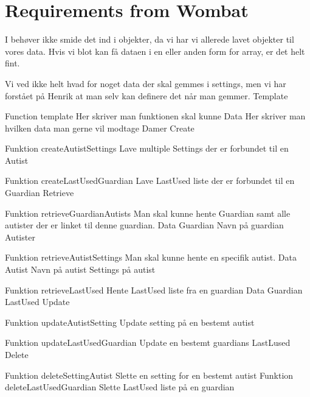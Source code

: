 \chapter{Requirements from Wombat}
\label{sec:timerreq}
I beh\o{}ver ikke smide det ind i objekter, da vi har vi allerede lavet objekter til vores data. 
Hvis vi blot kan f\aa{} dataen i en eller anden form for array, er det helt fint.

Vi ved ikke helt hvad for noget data der skal gemmes i settings, men vi har forst\aa{}et p\aa{} Henrik at man selv kan definere det n\aa{}r man gemmer.
Template

Function template
Her skriver man funktionen skal kunne
Data
Her skriver man hvilken data man gerne vil modtage
Damer
Create

Funktion createAutistSettings
Lave multiple Settings der er forbundet til en Autist

Funktion createLastUsedGuardian
Lave LastUsed liste der er forbundet til en Guardian
Retrieve

Funktion retrieveGuardianAutists
Man skal kunne hente Guardian samt alle autister der er linket til denne guardian.
Data
Guardian
Navn p\aa{} guardian
Autister

Funktion retrieveAutistSettings
Man skal kunne hente en specifik autist.
Data
Autist
Navn p\aa{} autist
Settings p\aa{} autist

Funktion retrieveLastUsed
Hente LastUsed liste fra en guardian
Data
Guardian
LastUsed
Update

Funktion updateAutistSetting
Update setting p\aa{} en bestemt autist

Funktion updateLastUsedGuardian
Update en bestemt guardians LastLused 
Delete

Funktion deleteSettingAutist
Slette en setting for en bestemt autist
Funktion deleteLastUsedGuardian
Slette LastUsed liste p\aa{} en guardian
